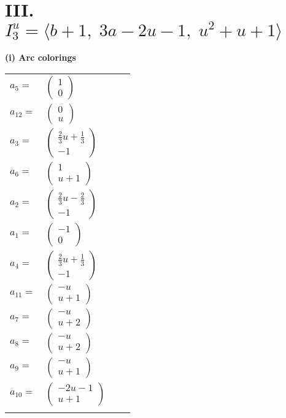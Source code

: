 \documentclass[1p]{elsarticle_modified}
\theoremstyle{definition}
\begin{document}
\centering \section*{III. $I^u_{3}= \langle b+1,\;3 a-2 u-1,\;u^2+u+1 \rangle$}
\flushleft \textbf{(i) Arc colorings}\\
\begin{tabular}{m{7pt} m{180pt} m{7pt} m{180pt} }
\flushright $a_{5}=$&$\begin{pmatrix}1\\0\end{pmatrix}$ \\
\flushright $a_{12}=$&$\begin{pmatrix}0\\u\end{pmatrix}$ \\
\flushright $a_{3}=$&$\begin{pmatrix}\frac{2}{3} u+\frac{1}{3}\\-1\end{pmatrix}$ \\
\flushright $a_{6}=$&$\begin{pmatrix}1\\u+1\end{pmatrix}$ \\
\flushright $a_{2}=$&$\begin{pmatrix}\frac{2}{3} u-\frac{2}{3}\\-1\end{pmatrix}$ \\
\flushright $a_{1}=$&$\begin{pmatrix}-1\\0\end{pmatrix}$ \\
\flushright $a_{4}=$&$\begin{pmatrix}\frac{2}{3} u+\frac{1}{3}\\-1\end{pmatrix}$ \\
\flushright $a_{11}=$&$\begin{pmatrix}- u\\u+1\end{pmatrix}$ \\
\flushright $a_{7}=$&$\begin{pmatrix}- u\\u+2\end{pmatrix}$ \\
\flushright $a_{8}=$&$\begin{pmatrix}- u\\u+2\end{pmatrix}$ \\
\flushright $a_{9}=$&$\begin{pmatrix}- u\\u+1\end{pmatrix}$ \\
\flushright $a_{10}=$&$\begin{pmatrix}-2 u-1\\u+1\end{pmatrix}$\\&\end{tabular}
\end{document}
